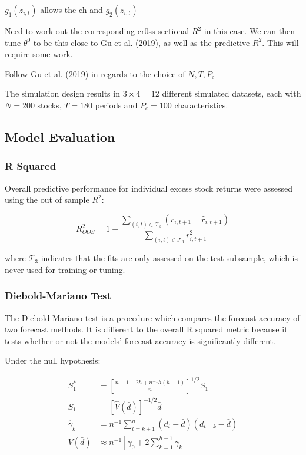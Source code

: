\documentclass[man, a4paper, biblatex]{article}
\begin{document}
$g_1 \left(z_{i, t}\right)$ allows the ch and $g_2 \left(z_{i, t}\right)$

Need to work out the corresponding cr0ss-sectional $R^2$ in this case. We can then tune $\theta^0$ to be this close to Gu et al. (2019), as well as the predictive $R^2$. This will require some work. 

Follow Gu et al. (2019) in regards to the choice of $N,T,P_{c}$

The simulation design results in $3 \times 4 = 12$ different simulated datasets, each with $N = 200$ stocks, $T = 180$ periods and $P_c = 100$ characteristics.

\subsection{Model Evaluation}

\subsubsection{R Squared}

Overall predictive performance for individual excess stock returns were assessed using the out of sample $R^2$:

\begin{equation}
	R^2_{OOS} = 1 - \frac{\sum_{(i, t)\in\mathcal{T}_3}(r_{i, t+1} - \widehat{r}_{i, t+1})}{\sum_{(i, t)\in\mathcal{T}_3}r_{i, t+1}^2}
\end{equation}

where $\mathcal{T}_3$ indicates that the fits are only assessed on the test subsample, which is never used for training or tuning. 

\subsubsection{Diebold-Mariano Test}

The Diebold-Mariano test is a procedure which compares the forecast accuracy of two forecast methods. It is different to the overall R squared metric because it tests whether or not the models' forecast accuracy is significantly different. 

Under the null hypothesis:

\begin{align}
	S_1^* &= \left[ 
		\frac{n + 1 - 2h + n^{-1}h(h-1)}
			{n}
	\right]^{1/2}S_1 \\
	S_1 &= \left[ 
		\hat{V}(\bar{d})
	\right] ^{-1/2}\bar{d} \\
	\hat{\gamma}_k &= n^{-1} \sum_{t = k + 1}^{n}(d_t - \bar{d})(d_{t-k} - \bar{d}) \\
	V(\bar{d}) &\approx n^{-1}\left[ 
		\gamma_0 + 2 \sum_{k = 1}^{h - 1}\gamma_k
	\right] 
\end{align}
\end{document}
